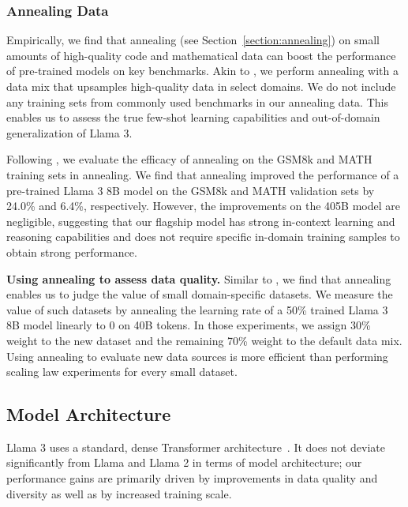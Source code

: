 \documentclass[dvipsnames]{fairmeta}
\begin{document}
\subsubsection{Annealing Data}
\label{sec:annealing_data}
Empirically, we find that annealing (see Section~\ref{section:annealing}) on small amounts of high-quality code and mathematical data can boost the performance of pre-trained models on key benchmarks.
Akin to \citet{li2024datacomplmsearchgenerationtraining}, we perform annealing with a data mix that upsamples high-quality data in select domains.
We do not include any training sets from commonly used benchmarks in our annealing data.
This enables us to assess the true few-shot learning capabilities and out-of-domain generalization of Llama 3.

Following \citet{openai2023gpt4}, we evaluate the efficacy of annealing on the GSM8k \citep{cobbe2021training} and MATH \citep{hendrycks2021measuring} training sets in annealing. 
We find that annealing improved the performance of a pre-trained Llama 3 8B model on the GSM8k and MATH validation sets by 24.0\% and 6.4\%, respectively.
However, the improvements on the 405B model are negligible, suggesting that our flagship model has strong in-context learning and reasoning capabilities and does not require specific in-domain training samples to obtain strong performance. 

\textbf{Using annealing to assess data quality.}
Similar to \citet{blakeney2024doesdatasparkjoy}, we find that annealing enables us to judge the value of small domain-specific datasets.
We measure the value of such datasets by annealing the learning rate of a 50\% trained Llama 3 8B model linearly to 0 on 40B tokens. 
In those experiments, we assign 30\% weight to the new dataset and the remaining 70\% weight to the default data mix.
Using annealing to evaluate new data sources is more efficient than performing scaling law experiments for every small dataset.

\subsection{Model Architecture}
\label{section:pretraining_model_architecture}

Llama 3 uses a standard, dense Transformer architecture~\citep{vaswani2017attention}.
It does not deviate significantly from Llama and Llama 2 \citep{touvron2023llama,touvron2023llama2} in terms of model architecture; our performance gains are primarily driven by improvements in data quality and diversity as well as by increased training scale.
\end{document}
